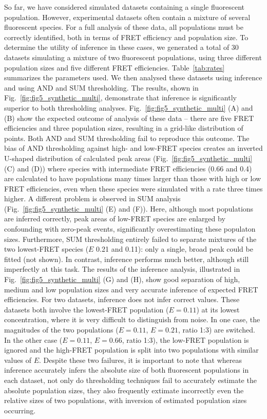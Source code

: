 So far, we have considered simulated datasets containing a single fluorescent population. However, experimental datasets often contain a  mixture of several fluorescent species. For a full analysis of these data, all populations must be correctly identified, both in terms of FRET efficiency and population size. To determine the utility of inference in these cases, we generated a total of 30 datasets simulating a mixture of two fluorescent populations, using three different population sizes and five different FRET efficiencies.  Table~\ref{tab:rates} summarizes the parameters used. We then analysed these datasets using inference and using AND and SUM thresholding. The results, shown in Fig.~\ref{fig:fig5_synthetic_multi}, demonstrate that inference is significantly superior to both thresholding analyses. Fig.~\ref{fig:fig5_synthetic_multi} (A) and (B) show the expected outcome of analysis of these data -- there are five FRET efficiencies and three population sizes, resulting in a grid-like distribution of points.  Both AND and SUM thresholding fail to reproduce this outcome.  The bias of AND thresholding against high- and low-FRET species creates an inverted U-shaped distribution of calculated peak areas (Fig.~\ref{fig:fig5_synthetic_multi} (C) and (D)) where species with intermediate FRET efficiencies (0.66 and 0.4) are calculated to have populations many times larger than those with high or low FRET efficiencies, even when these species were simulated with a rate three times higher.  A different problem is observed in SUM analysis (Fig.~\ref{fig:fig5_synthetic_multi} (E) and (F)). Here, although most populations are inferred correctly, peak areas of low-FRET species are enlarged by confounding with zero-peak events, significantly overestimating these populaton sizes. Furthermore, SUM thresholding entirely failed to separate mixtures of the two lowest-FRET species ($E$ 0.21 and 0.11): only a single, broad peak could be fitted (not shown). In contrast, inference performs much better, although still imperfectly at this task. The results of the inference analysis, illustrated in Fig.~\ref{fig:fig5_synthetic_multi} (G) and (H), show good separation of high, medium and low population sizes and very accurate inference of expected FRET efficiencies. For two datasets, inference does not infer correct values. These datasets both involve the lowest-FRET population ($E = 0.11$) at its lowest concentration, where it is very difficult to distinguish from noise. In one case, the magnitudes of the two populations ($E = 0.11$, $E = 0.21$, ratio 1:3) are switched. In the other case ($E = 0.11$, $E = 0.66$, ratio 1:3), the low-FRET population is ignored and the high-FRET population is split into two populations with similar values of $E$.  Despite these two failures, it is important to note that whereas inference accurately infers the absolute size of both fluorescent populations in each dataset, not only do thresholding techniques fail to accurately estimate the absolute population sizes, they also frequently extimate incorrectly even the relative sizes of two populations, with inversion of estimated population sizes occurring.
